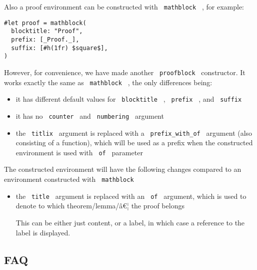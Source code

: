 Also a proof environment can be constructed with \texttt{\ mathblock\ }
, for example:

\begin{verbatim}
#let proof = mathblock(
  blocktitle: "Proof",
  prefix: [_Proof._],
  suffix: [#h(1fr) $square$],
)
\end{verbatim}

However, for convenience, we have made another \texttt{\ proofblock\ }
constructor. It works exactly the same as \texttt{\ mathblock\ } , the
only differences being:

\begin{itemize}
\tightlist
\item
  it has different default values for \texttt{\ blocktitle\ } ,
  \texttt{\ prefix\ } , and \texttt{\ suffix\ }
\item
  it has no \texttt{\ counter\ } and \texttt{\ numbering\ } argument
\item
  the \texttt{\ titlix\ } argument is replaced with a
  \texttt{\ prefix\_with\_of\ } argument (also consisting of a
  function), which will be used as a prefix when the constructed
  environment is used with \texttt{\ of\ } parameter
\end{itemize}

The constructed environment will have the following changes compared to
an environment constructed with \texttt{\ mathblock\ }

\begin{itemize}
\item
  the \texttt{\ title\ } argument is replaced with an \texttt{\ of\ }
  argument, which is used to denote to which theorem/lemma/â€¦ the proof
  belongs

  This can be either just content, or a label, in which case a reference
  to the label is displayed.
\end{itemize}

\subsection{FAQ}\label{faq}

